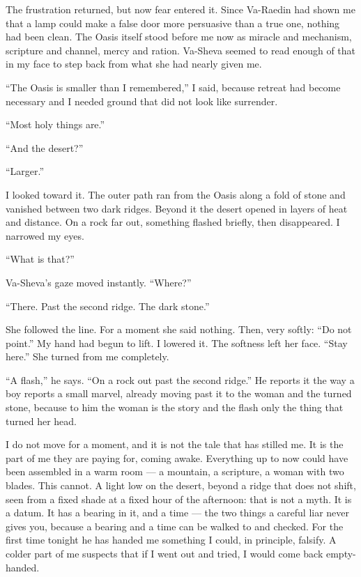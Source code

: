 The frustration returned, but now fear entered it. Since Va-Raedin had shown me that a lamp could make a false door more persuasive than a true one, nothing had been clean. The Oasis itself stood before me now as miracle and mechanism, scripture and channel, mercy and ration. Va-Sheva seemed to read enough of that in my face to step back from what she had nearly given me.\par

``The Oasis is smaller than I remembered,'' I said, because retreat had become necessary and I needed ground that did not look like surrender.\par

``Most holy things are.''\par

``And the desert?''\par

``Larger.''\par

I looked toward it. The outer path ran from the Oasis along a fold of stone and vanished between two dark ridges. Beyond it the desert opened in layers of heat and distance. On a rock far out, something flashed briefly, then disappeared. I narrowed my eyes.\par

``What is that?''\par

Va-Sheva's gaze moved instantly. ``Where?''\par

``There. Past the second ridge. The dark stone.''\par

She followed the line. For a moment she said nothing. Then, very softly: ``Do not point.'' My hand had begun to lift. I lowered it. The softness left her face. ``Stay here.'' She turned from me completely.\par

\ornament

\noindent ``A flash,'' he says. ``On a rock out past the second ridge.'' He reports it the way a boy reports a small marvel, already moving past it to the woman and the turned stone, because to him the woman is the story and the flash only the thing that turned her head.\par

I do not move for a moment, and it is not the tale that has stilled me. It is the part of me they are paying for, coming awake. Everything up to now could have been assembled in a warm room --- a mountain, a scripture, a woman with two blades. This cannot. A light low on the desert, beyond a ridge that does not shift, seen from a fixed shade at a fixed hour of the afternoon: that is not a myth. It is a datum. It has a bearing in it, and a time --- the two things a careful liar never gives you, because a bearing and a time can be walked to and checked. For the first time tonight he has handed me something I could, in principle, falsify. A colder part of me suspects that if I went out and tried, I would come back empty-handed.\par


